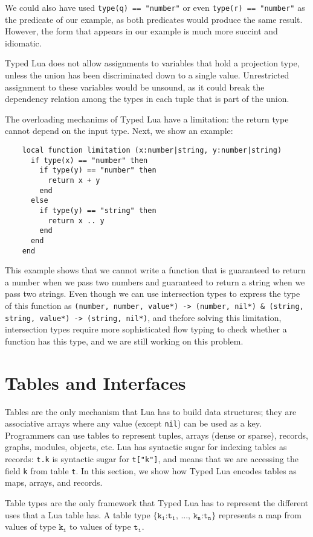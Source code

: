 We could also have used \texttt{type(q) == "number"} or
even \texttt{type(r) == "number"} as the predicate of our example,
as both predicates would produce the same result.
However, the form that appears in our example is much more succint and idiomatic.

Typed Lua does not allow assignments to variables that hold a projection type,
unless the union has been discriminated down to a single value.
Unrestricted assignment to these variables would be unsound,
as it could break the dependency relation among the types in each tuple
that is part of the union.

The overloading mechanims of Typed Lua have a limitation:
the return type cannot depend on the input type.
Next, we show an example:
\begin{verbatim}
    local function limitation (x:number|string, y:number|string)
      if type(x) == "number" then
        if type(y) == "number" then
          return x + y
        end
      else
        if type(y) == "string" then
          return x .. y
        end
      end
    end
\end{verbatim}

This example shows that we cannot write a function that is
guaranteed to return a number when we pass two numbers and
guaranteed to return a string when we pass two strings.
Even though we can use intersection types to express the type
of this function as
\texttt{(number, number, value*) -> (number, nil*) \string&
(string, string, value*) -> (string, nil*)},
and thefore solving this limitation,
intersection types require more sophisticated flow typing to
check whether a function has this type,
and we are still working on this problem.

\section{Tables and Interfaces}

Tables are the only mechanism that Lua has to build data structures;
they are associative arrays where any value (except \texttt{nil})
can be used as a key.
Programmers can use tables to represent tuples, arrays (dense or sparse),
records, graphs, modules, objects, etc.
Lua has syntactic sugar for indexing tables as records:
\texttt{t.k} is syntactic sugar for \texttt{t["k"]}, and means that
we are accessing the field \texttt{k} from table \texttt{t}. 
In this section, we show how Typed Lua encodes tables as maps,
arrays, and records.

Table types are the only framework that Typed Lua has to represent
the different uses that a Lua table has.
A table type $\texttt{\{k}{_\texttt{1}}\texttt{:t}_{\texttt{1}}
\texttt{, ..., k}{_\texttt{n}}\texttt{:t}_{\texttt{n}}\texttt{\}}$ represents a map
from values of type $\texttt{k}_{\texttt{i}}$ to values of type
$\texttt{t}_{\texttt{i}}$.

